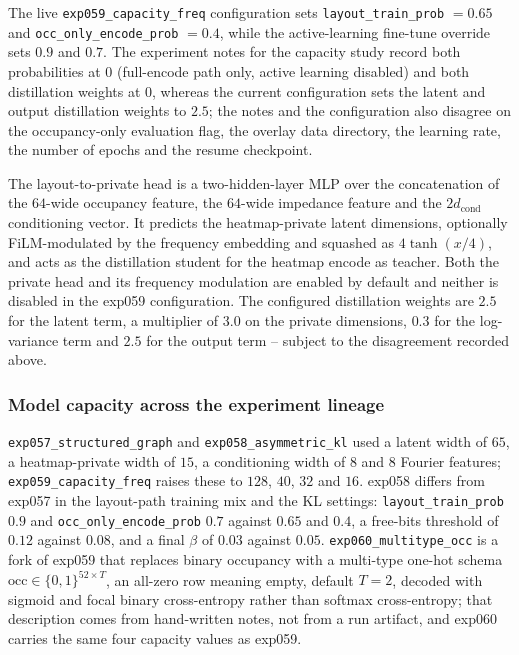 The live \texttt{exp059\_capacity\_freq} configuration sets
\texttt{layout\_train\_prob} $=0.65$ and \texttt{occ\_only\_encode\_prob} $=0.4$,
while the active-learning fine-tune override sets $0.9$ and $0.7$. The
experiment notes for the capacity study record both probabilities at $0$
(full-encode path only, active learning disabled) and both distillation weights
at $0$, whereas the current configuration sets the latent and output
distillation weights to $2.5$; the notes and the configuration also disagree on
the occupancy-only evaluation flag, the overlay data directory, the learning
rate, the number of epochs and the resume checkpoint.

The layout-to-private head is a two-hidden-layer MLP over the concatenation of
the $64$-wide occupancy feature, the $64$-wide impedance feature and the
$2 d_{\mathrm{cond}}$ conditioning vector. It predicts the heatmap-private latent
dimensions, optionally FiLM-modulated by the frequency embedding and squashed as
$4\tanh(x/4)$, and acts as the distillation student for the heatmap encode as
teacher. Both the private head and its frequency modulation are enabled by
default and neither is disabled in the exp059 configuration. The configured
distillation weights are $2.5$ for the latent term, a multiplier of $3.0$ on the
private dimensions, $0.3$ for the log-variance term and $2.5$ for the output
term -- subject to the disagreement recorded above.

\subsubsection*{Model capacity across the experiment lineage}

\texttt{exp057\_structured\_graph} and \texttt{exp058\_asymmetric\_kl} used a
latent width of $65$, a heatmap-private width of $15$, a conditioning width of
$8$ and $8$ Fourier features; \texttt{exp059\_capacity\_freq} raises these to
$128$, $40$, $32$ and $16$. exp058 differs from exp057 in the layout-path
training mix and the KL settings: \texttt{layout\_train\_prob} $0.9$ and
\texttt{occ\_only\_encode\_prob} $0.7$ against $0.65$ and $0.4$, a free-bits
threshold of $0.12$ against $0.08$, and a final $\beta$ of $0.03$ against $0.05$.
\texttt{exp060\_multitype\_occ} is a fork of exp059 that replaces binary
occupancy with a multi-type one-hot schema
$\mathrm{occ} \in \{0,1\}^{52 \times T}$, an all-zero row meaning empty, default
$T = 2$, decoded with sigmoid and focal binary cross-entropy rather than softmax
cross-entropy; that description comes from hand-written notes, not from a run
artifact, and exp060 carries the same four capacity values as exp059.

